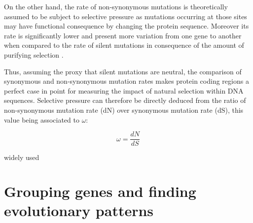 On the other hand, the rate of non-synonymous mutations is theoretically assumed to be subject to selective pressure as mutations occurring at those sites may have functional consequence by changing the protein sequence. Moreover its rate is significantly lower and present more variation from one gene to another when compared to the rate of silent mutations in consequence of the amount of purifying selection \cite{Kimura1985}.

Thus, assuming the proxy that silent mutations are neutral, the comparison of synonymous and non-synonymous mutation rates makes protein coding regions a perfect case in point for measuring the impact of natural selection within DNA sequences. Selective pressure can therefore be directly deduced from the ratio of non-synonymous mutation rate (dN) over synonymous mutation rate (dS), this value being associated to $\omega$:


\begin{equation} \label{eq:omega}
\omega = \frac {dN}{dS}
\end{equation}

widely used \cite{Pond2005}

\section{Grouping genes and finding evolutionary patterns}



